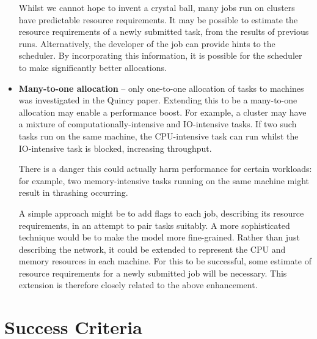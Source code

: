 \begin{itemize}
        Whilst we cannot hope to invent a crystal ball, many jobs run on clusters have predictable resource requirements. It may be possible to estimate the resource requirements of a newly submitted task, from the results of previous runs. Alternatively, the developer of the job can provide hints to the scheduler. By incorporating this information, it is possible for the scheduler to make significantly better allocations. 
  \item \textbf{Many-to-one allocation} -- only one-to-one allocation of tasks to machines was investigated in the Quincy paper. Extending this to be a many-to-one allocation may enable a performance boost. For example, a cluster may have a mixture of computationally-intensive and IO-intensive tasks. If two such tasks run on the same machine, the CPU-intensive task can run whilst the IO-intensive task is blocked, increasing throughput.

        There is a danger this could actually harm performance for certain workloads: for example, two memory-intensive tasks running on the same machine might result in thrashing occurring. 

        A simple approach might be to add flags to each job, describing its resource requirements, in an attempt to pair tasks suitably. A more sophisticated technique would be to make the model more fine-grained. Rather than just describing the network, it could be extended to represent the CPU and memory resources in each machine. For this to be successful, some estimate of resource requirements for a newly submitted job will be necessary. This extension is therefore closely related to the above enhancement.
\end{itemize}

\section*{Success Criteria}

